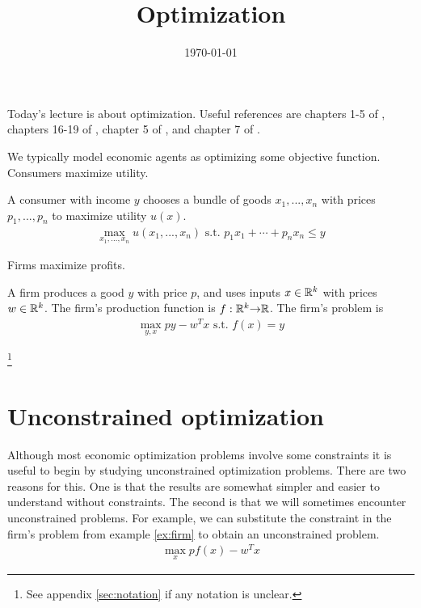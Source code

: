  

\title{Optimization}
\date{\today}



\maketitle

Today's lecture is about optimization. Useful references are chapters
1-5 of \cite{dixit1990}, chapters 16-19 of \cite{sb1994}, chapter
5 of \cite{carter2001}, and chapter 7 of \cite{fuente2000}.

We typically model economic agents as optimizing some objective
function. Consumers maximize utility.
\begin{example}
  A consumer with income $y$ chooses a bundle of goods $x_1, ...,
  x_n$ with prices $p_1, ..., p_n$ to maximize utility
  $u(x)$.
  \begin{align*}
    \max_{x_1, ..., x_n} u(x_1, ..., x_n) \text{ s.t. } p_1 x_1 +
    \cdots + p_n x_n \leq y
  \end{align*}
\end{example}
Firms maximize profits.
\begin{example}\label{ex:firm}
  A firm produces a good $y$ with price $p$, and
  uses inputs $x \in \mathbb{R}^k$ with prices $w \in \mathbb{R}^k$. The firm's
  production function is $f: \mathbb{R}^k {\rightarrow} \mathbb{R}$. The firm's problem is
  \begin{align*}
    \max_{y,x} py - w^T x \text{ s.t. } f(x) = y 
  \end{align*}
\end{example}
\footnote{See appendix \ref{sec:notation} if any notation is unclear.}

\section{Unconstrained optimization}

Although most economic optimization problems involve some constraints
it is useful to begin by studying unconstrained optimization
problems. There are two reasons for this. One is that the results are
somewhat simpler and easier to understand without constraints. The
second is that we will sometimes encounter unconstrained problems. For
example, we can substitute the constraint in the firm's problem from
example \ref{ex:firm} to obtain an unconstrained problem.
\begin{align*}
  \max_{x} pf(x) - w^T x 
\end{align*}

